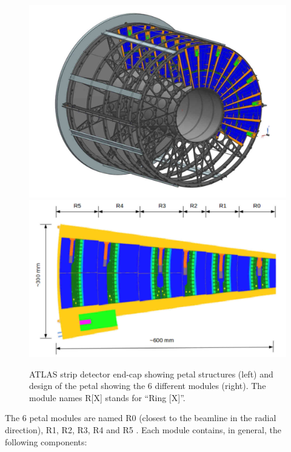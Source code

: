 		\begin{figure}[ht!]
			\centering
			\captionsetup{justification=centering,margin=2cm}
			\includegraphics[scale=0.25]{Figures/Chapter02/EndCap.jpg}
			\includegraphics[scale=0.26]{Figures/Chapter02/PetalDesign.jpg}
			\caption{ATLAS strip detector end-cap showing petal structures (left) and  design of the petal showing the 6 different modules (right). The module names R[X] stands for “Ring [X]”.}\label{fig2.1}
		\end{figure}
		
		The 6 petal modules are named R0 (closest to the beamline in the radial direction), R1, R2, R3, R4 and R5 . Each module contains, in general, the following components:
		
